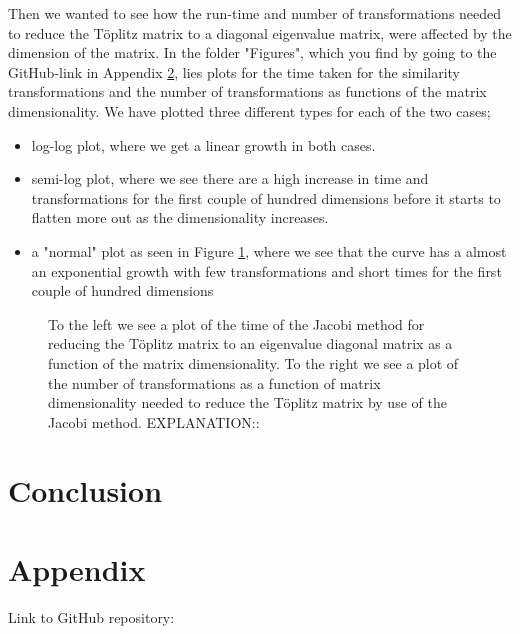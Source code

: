 \documentclass[12pt,a4paper,english]{article}
\begin{document}
Then we wanted to see how the run-time and number of transformations needed to reduce the Töplitz matrix to a diagonal eigenvalue matrix, were affected by the dimension of the matrix. In the folder "Figures", which you find by going to the GitHub-link in Appendix \ref{sect:appendix}, lies plots for the time taken for the similarity transformations and the number of transformations as functions of the matrix dimensionality. We have plotted three different types for each of the two cases; 
\begin{itemize}
	\item log-log plot, where we get a linear growth in both cases.
	\item semi-log plot, where we see there are a high increase in time and transformations for the first couple of hundred dimensions before it starts to flatten more out as the dimensionality increases.
	\item a "normal" plot as seen in Figure \ref{fig:time_transf}, where we see that the curve has a almost an exponential growth with few transformations and short times for the first couple of hundred dimensions
\end{itemize}
\begin{figure}[htbp]
	\caption{To the left we see a plot of the time of the Jacobi method for reducing the Töplitz matrix to an eigenvalue diagonal matrix as a function of the matrix dimensionality. To the right we see a plot of the number of transformations as a function of matrix dimensionality needed to reduce the Töplitz matrix by use of the Jacobi method. EXPLANATION::\label{fig:time_transf}}
\end{figure}

\section{Conclusion}

\appendix
\section{Appendix}
\label{sect:appendix}
Link to GitHub repository:



\end{document}
